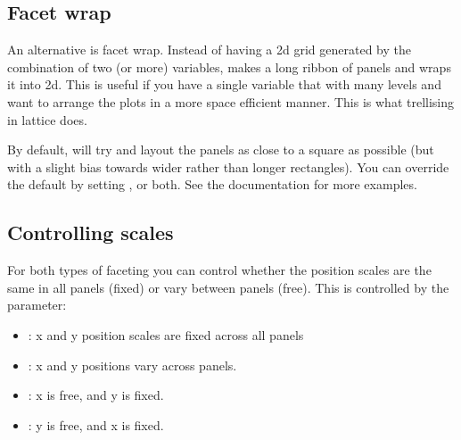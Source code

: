 \subsection{Facet wrap}
\label{sub:facet_wrap}

An alternative is facet wrap.  Instead of having a 2d grid generated by the combination of two (or more) variables,  makes a long ribbon of panels and wraps it into 2d.  This is useful if you have a single variable that with many levels and want to arrange the plots in a more space efficient manner.  This is what trellising in lattice does.

% 


By default,  will try and layout the panels as close to a square as possible (but with a slight bias towards wider rather than longer rectangles).  You can override the default by setting ,  or both.  See the documentation for more examples.

\subsection{Controlling scales}
\label{sub:controlling_scales}

For both types of faceting you can control whether the position scales are the same in all panels (fixed) or vary between panels (free).  This is controlled by the  parameter:

\begin{itemize}
  \item {}: x and y position scales are fixed across all panels
  \item {}: x and y positions vary across panels.
  \item {}: x is free, and y is fixed.
  \item {}: y is free, and x is fixed.
\end{itemize}

% 



